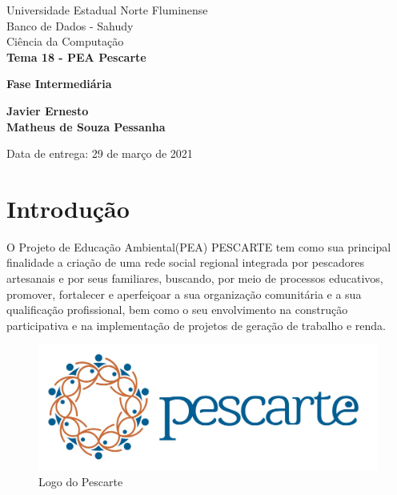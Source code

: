 \documentclass[11pt]{../../classes/ifscarticle}
\begin{document}
\begin{center}

    {\large Universidade Estadual Norte Fluminense}\\[0.2cm] %
    {\large Banco de Dados - Sahudy }\\[0.2cm] %
    {\large Ciência da Computação}\\[5.2cm]


    {\Huge \bfseries Tema 18 - PEA Pescarte}

    \vspace{.5cm}

    {\LARGE \bfseries Fase Intermediária}

    \vfill
\end{center}
\begin{tabbing}

\end{tabbing}

{\noindent \large \bfseries
Javier Ernesto
\\[.5em] Matheus de Souza Pessanha
}


\begin{flushright}
    Data de entrega: 29 de mar\c{c}o de 2021
\end{flushright}

\clearpage
\pagestyle{firstpage}


\tableofcontents
\clearpage


\section{Introdução}
\label{sec:introducao}

O Projeto de Educação Ambiental(PEA) PESCARTE tem como sua principal finalidade a criação de uma rede social regional integrada por pescadores artesanais e por seus familiares, buscando, por meio de processos educativos, promover, fortalecer e aperfeiçoar a sua organização comunitária e a sua qualificação profissional, bem como o seu envolvimento na construção participativa e na implementação de projetos de geração de trabalho e renda.
\begin{figure}[ht]
    \centering
    \includegraphics[width=.5\linewidth]{figuras/logoPescarte}
    \caption{Logo do Pescarte}
    \label{fig:logolatex}
\end{figure}
\end{document}
